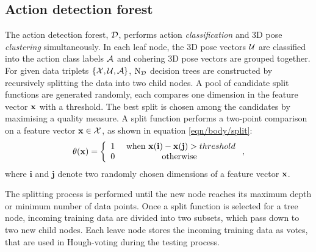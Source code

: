 \subsection{Action detection forest}
\label{sec/body/adflearn}
The action detection forest, $\mathcal{D}$, performs action \emph{classification} and 3D pose \emph{clustering} simultaneously.  
In each leaf node, the 3D pose vectors $\mathcal{U}$ are classified into the action class labels $\mathcal{A}$ and cohering 3D pose vectors are grouped together.
For given data triplets $\{\mathcal{X},\mathcal{U}, \mathcal{A}\}$, $\mathrm{N_{\mathcal{D}}}$ decision trees are constructed by recursively splitting the data into two child nodes. 
A pool of candidate split functions are generated randomly, each compares one dimension in the feature vector $\mathbf{x}$ with a threshold. 
The best split is chosen among the candidates by maximising a quality measure. 
A split function performs a two-point comparison on a feature vector $\mathbf{x} \in \mathcal{X}$, as shown in equation \ref{eqn/body/split}: 
\begin{equation}
	\theta(\mathbf{x}) = 
	\left\{
		\begin{array}{lc} 
			1 & \mbox{ when } \mathbf{x}(\mathbf{i}) - \mathbf{x}(\mathbf{j}) > threshold \\  
			0 & \mbox{ otherwise } 
		\end{array}
	\right.,
	\label{eqn/body/split}
\end{equation}
where $\mathbf{i}$ and $\mathbf{j}$ denote two randomly chosen dimensions of a feature vector $\mathbf{x}$. 

The splitting process is performed until the new node reaches its maximum depth or minimum number of data points. 
Once a split function is selected for a tree node, incoming training data are divided into two subsets, which pass down to two new child nodes.  
Each leave node stores the incoming training data as votes, that are used in Hough-voting during the testing process. 

